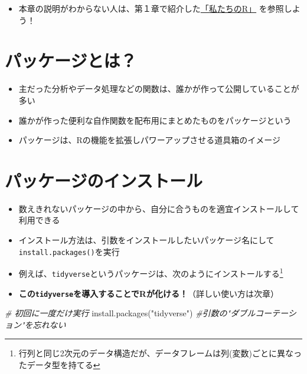 \documentclass[
]{book}
\newenvironment{Shaded}{\begin{snugshade}}{\end{snugshade}}
\newcommand{\CommentTok}[1]{\textcolor[rgb]{0.56,0.35,0.01}{\textit{#1}}}
\newcommand{\FunctionTok}[1]{\textcolor[rgb]{0.00,0.00,0.00}{#1}}
\newcommand{\NormalTok}[1]{#1}
\newcommand{\StringTok}[1]{\textcolor[rgb]{0.31,0.60,0.02}{#1}}
\providecommand{\tightlist}{%
  \setlength{\itemsep}{0pt}\setlength{\parskip}{0pt}}
\begin{document}
\begin{itemize}
\tightlist
\item
  本章の説明がわからない人は、第１章で紹介した\href{https://www.jaysong.net/RBook/datahandling1.html}{「私たちのR」} を参照しよう！
\end{itemize}

\hypertarget{ux30d1ux30c3ux30b1ux30fcux30b8ux3068ux306f}{%
\section{パッケージとは？}\label{ux30d1ux30c3ux30b1ux30fcux30b8ux3068ux306f}}

\begin{itemize}
\tightlist
\item
  主だった分析やデータ処理などの関数は、誰かが作って公開していることが多い
\item
  誰かが作った便利な自作関数を配布用にまとめたものをパッケージという
\item
  パッケージは、Rの機能を拡張しパワーアップさせる道具箱のイメージ
\end{itemize}

\hypertarget{ux30d1ux30c3ux30b1ux30fcux30b8ux306eux30a4ux30f3ux30b9ux30c8ux30fcux30eb}{%
\section{パッケージのインストール}\label{ux30d1ux30c3ux30b1ux30fcux30b8ux306eux30a4ux30f3ux30b9ux30c8ux30fcux30eb}}

\begin{itemize}
\tightlist
\item
  数えきれないパッケージの中から、自分に合うものを適宜インストールして利用できる
\item
  インストール方法は、引数をインストールしたいパッケージ名にして\texttt{install.packages()}を実行
\item
  例えば、\texttt{tidyverse}というパッケージは、次のようにインストールする\footnote{行列と同じ2次元のデータ構造だが、データフレームは列(変数)ごとに異なったデータ型を持てる}
\item
  \textbf{この\texttt{tidyverse}を導入することでRが化ける！}（詳しい使い方は次章）
\end{itemize}

\begin{Shaded}
\begin{Highlighting}[]
\CommentTok{\# 初回に一度だけ実行}
\FunctionTok{install.packages}\NormalTok{(}\StringTok{"tidyverse"}\NormalTok{) }\CommentTok{\#引数の"ダブルコーテーション"を忘れない}
\end{Highlighting}
\end{Shaded}
\end{document}
